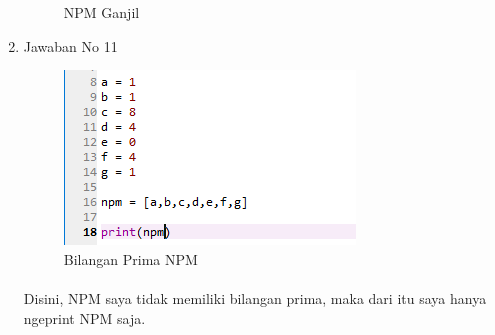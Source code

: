 \documentclass{article}
\begin{document}
\begin{enumerate}
\begin{figure}[!htbp]
        \caption{NPM Ganjil}
    \end{figure}
    \item Jawaban No 11
    \begin{figure}[!htbp]
        \centering
        \includegraphics{PrimaNPM.PNG}
        \caption{Bilangan Prima NPM}
    \end{figure}
    \paragraph{} Disini, NPM saya tidak memiliki bilangan prima, maka dari itu saya hanya ngeprint NPM saja.
\end{enumerate}
\end{document}
